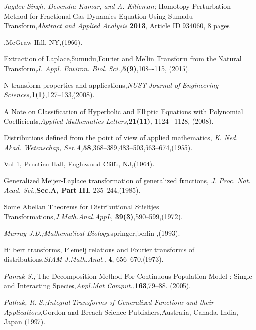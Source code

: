 \begin{thebibliography}{00}
 {\sl Jagdev Singh, Devendra Kumar, and A. Kilicman;} Homotopy Perturbation Method for Fractional Gas Dynamics Equation Using Sumudu Transform,{\it Abstract and Applied Analysis }{\bf  2013}, Article ID 934060, 8 pages


,McGraw-Hill, NY,(1966).

Extraction of Laplace,Sumudu,Fourier
and Mellin Transform from the Natural Transform,{\it J. Appl. Environ. Biol. Sci.,}{\bf 5(9)},108–-115, (2015).

N-transform properties and applications,{\it NUST Journal of Engineering Sciences,}{\bf 1(1)},127--133,(2008).


A Note on Classification of Hyperbolic and Elliptic
Equations with Polynomial Coefficients,{\it Applied Mathematics Letters},{\bf 21(11)}, 1124-–1128, (2008).

Distributions defined from the point of view of applied mathematics, {\it K. Ned. Akad. Wetenschap, Ser.A,}{\bf 58},368--389,483--503,663--674,(1955).


 Vol-1, Prentice Hall, Englewood Cliffs, NJ,(1964).

 Generalized Meijer-Laplace transformation of generalized functions, {\it J. Proc. Nat. Acad. Sci.,}{\bf Sec.A, Part III}, 235--244,(1985).

Some Abelian Theorems for Distributional Stieltjes Transformations,{\it J.Math.Anal.AppL,} {\bf 39(3)},590--599,(1972).

 {\sl Murray J.D.;}{\it Mathematical Biology},springer,berlin ,(1993).

 Hilbert transforms, Plemelj relations and Fourier transforms of distributions,{\it SIAM J.Math.Anal., }{\bf 4}, 656--670,(1973).

  {\sl Pamuk S.;} The Decomposition Method For Continuous Population Model : Single and Interacting Species,{\it Appl.Mat Comput.,}{\bf 163},79--88, (2005).

 {\sl Pathak, R. S.;}{\it Integral Transforms of Generalized Functions and their Applications},Gordon and Breach Science Publishers,Australia, Canada, India, Japan (1997).


\end{thebibliography}
